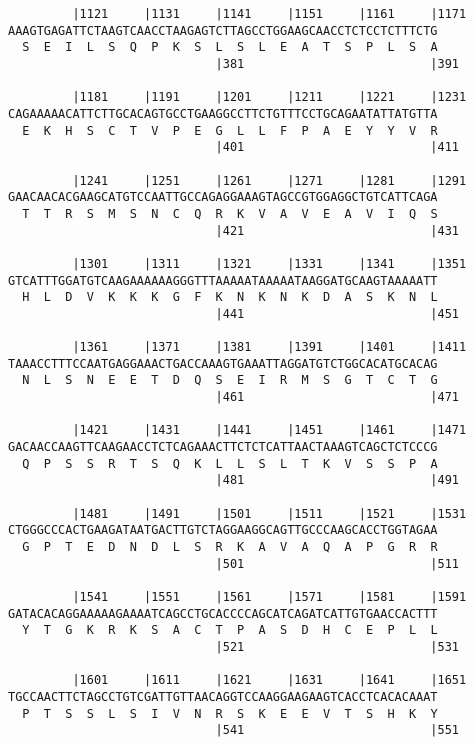 \documentclass{article}
\begin{document}
\begin{Verbatim}
         |1121     |1131     |1141     |1151     |1161     |1171
AAAGTGAGATTCTAAGTCAACCTAAGAGTCTTAGCCTGGAAGCAACCTCTCCTCTTTCTG
  S  E  I  L  S  Q  P  K  S  L  S  L  E  A  T  S  P  L  S  A
                             |381                          |391
  
         |1181     |1191     |1201     |1211     |1221     |1231
CAGAAAAACATTCTTGCACAGTGCCTGAAGGCCTTCTGTTTCCTGCAGAATATTATGTTA
  E  K  H  S  C  T  V  P  E  G  L  L  F  P  A  E  Y  Y  V  R
                             |401                          |411
  
         |1241     |1251     |1261     |1271     |1281     |1291
GAACAACACGAAGCATGTCCAATTGCCAGAGGAAAGTAGCCGTGGAGGCTGTCATTCAGA
  T  T  R  S  M  S  N  C  Q  R  K  V  A  V  E  A  V  I  Q  S
                             |421                          |431
  
         |1301     |1311     |1321     |1331     |1341     |1351
GTCATTTGGATGTCAAGAAAAAAGGGTTTAAAAATAAAAATAAGGATGCAAGTAAAAATT
  H  L  D  V  K  K  K  G  F  K  N  K  N  K  D  A  S  K  N  L
                             |441                          |451
  
         |1361     |1371     |1381     |1391     |1401     |1411
TAAACCTTTCCAATGAGGAAACTGACCAAAGTGAAATTAGGATGTCTGGCACATGCACAG
  N  L  S  N  E  E  T  D  Q  S  E  I  R  M  S  G  T  C  T  G
                             |461                          |471
  
         |1421     |1431     |1441     |1451     |1461     |1471
GACAACCAAGTTCAAGAACCTCTCAGAAACTTCTCTCATTAACTAAAGTCAGCTCTCCCG
  Q  P  S  S  R  T  S  Q  K  L  L  S  L  T  K  V  S  S  P  A
                             |481                          |491
  
         |1481     |1491     |1501     |1511     |1521     |1531
CTGGGCCCACTGAAGATAATGACTTGTCTAGGAAGGCAGTTGCCCAAGCACCTGGTAGAA
  G  P  T  E  D  N  D  L  S  R  K  A  V  A  Q  A  P  G  R  R
                             |501                          |511
  
         |1541     |1551     |1561     |1571     |1581     |1591
GATACACAGGAAAAAGAAAATCAGCCTGCACCCCAGCATCAGATCATTGTGAACCACTTT
  Y  T  G  K  R  K  S  A  C  T  P  A  S  D  H  C  E  P  L  L
                             |521                          |531
  
         |1601     |1611     |1621     |1631     |1641     |1651
TGCCAACTTCTAGCCTGTCGATTGTTAACAGGTCCAAGGAAGAAGTCACCTCACACAAAT
  P  T  S  S  L  S  I  V  N  R  S  K  E  E  V  T  S  H  K  Y
                             |541                          |551
  

\end{Verbatim}
\end{document}

